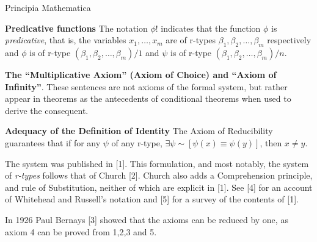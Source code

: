 \begin{entry}{Principia Mathematica}
\begin{clarifications}
{\bf Predicative functions} The notation $\phi !$ indicates that the function $\phi$ is {\em predicative}, that is,  the variables $x_1, \ldots , x_m$ are of r-types $\beta_1, \beta_2, \ldots, \beta_m$ respectively and $\phi$ is of r-type $(\beta_1, \beta_2, \ldots, \beta_m )/1 $ and $\psi$ is of r-type $(\beta_1, \beta_2, \ldots, \beta_m) /n $. 

{\bf The ``Multiplicative Axiom'' (Axiom of Choice)  and ``Axiom of Infinity''}. These sentences are not axioms of the formal system, but rather appear in theorems as the antecedents of conditional theorems when used to derive the consequent. 

{\bf Adequacy of the Definition of Identity} The Axiom of Reducibility guarantees that if for any $\psi$ of any r-type,  $\exists \psi \sim \! [\psi (x) \equiv \psi (y)] $, then $x \neq y$. 
\end{clarifications}

\begin{history}
The system was published in [1]. This formulation, and most notably, the system of {\em r-types} follows that of Church [2]. Church also adds a Comprehension principle, and rule of Substitution, neither of which are explicit in [1]. See [4] for an account of Whitehead and Russell's notation and [5] for a survey of the contents of [1].
\end{history}

\begin{technicalities}
In 1926 Paul Bernays [3] showed that the axioms can be reduced by one, as axiom 4 can be proved from 1,2,3 and 5.
\end{technicalities}


\end{entry}
